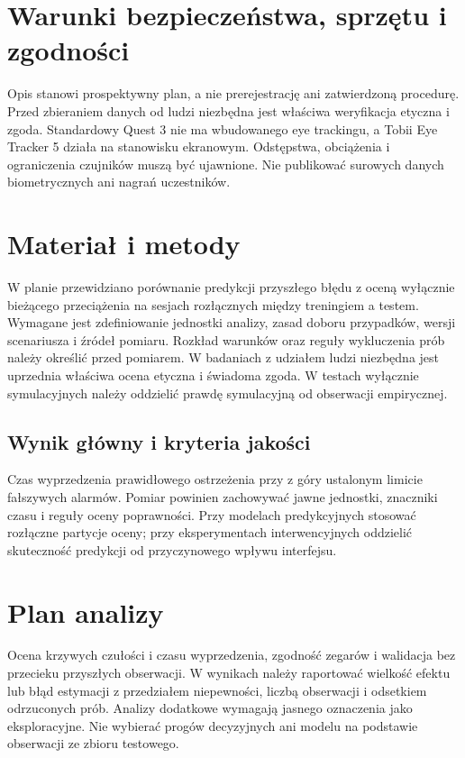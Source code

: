 \documentclass[11pt,a4paper]{article}
\begin{document}
\section{Warunki bezpieczeństwa, sprzętu i zgodności}
Opis stanowi prospektywny plan, a nie prerejestrację ani zatwierdzoną procedurę. Przed zbieraniem danych od ludzi niezbędna jest właściwa weryfikacja etyczna i zgoda. Standardowy Quest 3 nie ma wbudowanego eye trackingu, a Tobii Eye Tracker 5 działa na stanowisku ekranowym. Odstępstwa, obciążenia i ograniczenia czujników muszą być ujawnione. Nie publikować surowych danych biometrycznych ani nagrań uczestników.

\section{Materiał i metody}

W planie przewidziano porównanie predykcji przyszłego błędu z oceną wyłącznie bieżącego przeciążenia na sesjach rozłącznych między treningiem a testem. Wymagane jest zdefiniowanie jednostki analizy, zasad doboru przypadków, wersji scenariusza i źródeł pomiaru. Rozkład warunków oraz reguły wykluczenia prób należy określić przed pomiarem. W badaniach z udziałem ludzi niezbędna jest uprzednia właściwa ocena etyczna i świadoma zgoda. W testach wyłącznie symulacyjnych należy oddzielić prawdę symulacyjną od obserwacji empirycznej.

\subsection{Wynik główny i kryteria jakości}

Czas wyprzedzenia prawidłowego ostrzeżenia przy z góry ustalonym limicie fałszywych alarmów. Pomiar powinien zachowywać jawne jednostki, znaczniki czasu i reguły oceny poprawności. Przy modelach predykcyjnych stosować rozłączne partycje oceny; przy eksperymentach interwencyjnych oddzielić skuteczność predykcji od przyczynowego wpływu interfejsu.

\section{Plan analizy}

Ocena krzywych czułości i czasu wyprzedzenia, zgodność zegarów i walidacja bez przecieku przyszłych obserwacji. W wynikach należy raportować wielkość efektu lub błąd estymacji z przedziałem niepewności, liczbą obserwacji i odsetkiem odrzuconych prób. Analizy dodatkowe wymagają jasnego oznaczenia jako eksploracyjne. Nie wybierać progów decyzyjnych ani modelu na podstawie obserwacji ze zbioru testowego.
\end{document}
